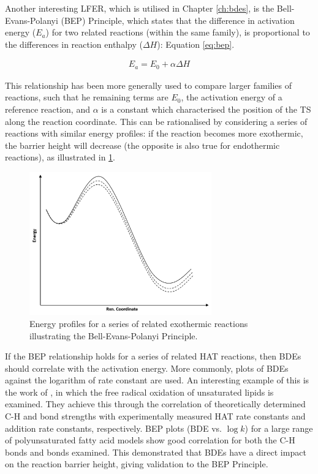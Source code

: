 Another interesting LFER, which is utilised in Chapter \ref{ch:bdes}, is the
Bell-Evans-Polanyi (BEP) Principle,\cite{Bell1936,Evans1938} which states that
the difference in activation energy ($E_a$) for two related reactions (within
the same family), is proportional to the differences in reaction enthalpy
($\Delta H$): Equation \ref{eq:bep}.

\begin{align}
  E_a = E_0 + \alpha \Delta H
  \label{eq:bep}
\end{align}  

\noindent This relationship has been more generally used to compare larger
families of reactions, such that he remaining terms are $E_0$, the activation
energy of a reference reaction, and $\alpha$ is a constant which characterised
the position of the TS along the reaction coordinate. This can be rationalised
by considering a series of reactions with similar energy profiles: if the
reaction becomes more exothermic, the barrier height will decrease (the opposite
is also true for endothermic reactions), as illustrated in \ref{fig:bep}. 

\begin{figure}[htb]
  \centering
  \includegraphics[width=0.7\textwidth]{figures/bep}
  \caption{Energy profiles for a series of related exothermic reactions
    illustrating the Bell-Evans-Polanyi Principle.}
  \label{fig:bep}
\end{figure}

If the BEP relationship holds for a series of related HAT reactions, then BDEs
should correlate with the activation energy. More commonly, plots of BDEs
against the logarithm of rate constant are used. An interesting example of this
is the work of \citet{Pratt2003}, in which the free radical oxidation of
unsaturated lipids is examined. They achieve this through the correlation of
theoretically determined C-H and  bond strengths with experimentally
measured HAT rate constants and  addition rate constants,
respectively. BEP plots (BDE vs. $\log k$) for a large range of polyunsaturated
fatty acid models show good correlation for both the C-H bonds and 
bonds examined. This demonstrated that BDEs have a direct impact on the reaction
barrier height, giving validation to the BEP Principle.

